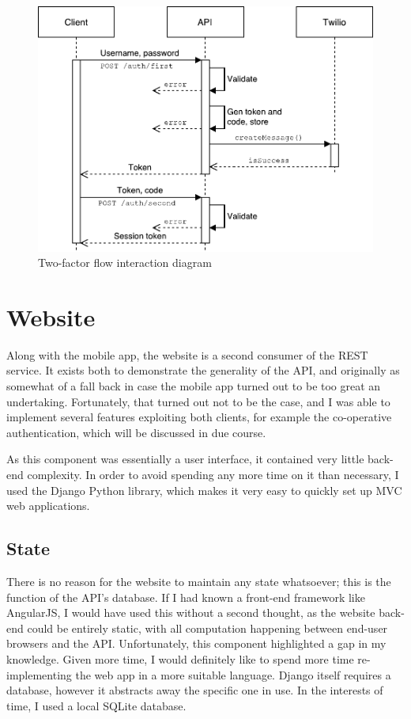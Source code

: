 \documentclass[12pt,a4paper]{bhamdissertation}
\begin{document}
\begin{figure}[!htbp]
    \centering
    \includegraphics[width=.8\linewidth]{img/2fa_interaction.pdf}
    \caption{Two-factor flow interaction diagram}
    \label{img:2fa_interaction}
\end{figure}

\section{Website}

Along with the mobile app, the website is a second consumer of the REST service. It exists both to demonstrate the generality of the API, and originally as somewhat of a fall back in case the mobile app turned out to be too great an undertaking. Fortunately, that turned out not to be the case, and I was able to implement several features exploiting both clients, for example the co-operative authentication, which will be discussed in due course.

As this component was essentially a user interface, it contained very little back-end complexity. In order to avoid spending any more time on it than necessary, I used the Django Python library, which makes it very easy to quickly set up MVC web applications.

\subsection{State}

There is no reason for the website to maintain any state whatsoever; this is the function of the API's database. If I had known a front-end framework like AngularJS, I would have used this without a second thought, as the website back-end could be entirely static, with all computation happening between end-user browsers and the API. Unfortunately, this component highlighted a gap in my knowledge. Given more time, I would definitely like to spend more time re-implementing the web app in a more suitable language. Django itself requires a database, however it abstracts away the specific one in use. In the interests of time, I used a local SQLite database.
\end{document}
